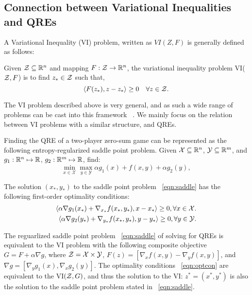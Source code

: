 \subsection{Connection between Variational Inequalities and QREs}
A Variational Inequality (VI) problem, written as $VI(Z, F)$ is generally defined as follows:
\begin{definition}
	\label{def:vi} Given $\mathcal{Z} \subseteq \mathbb{R}^n$ and mapping $F: \mathcal{Z} \rightarrow
		\mathbb{R}^n$, the variational inequality problem VI($\mathcal{Z}, F$) is to find $z_{\ast} \in \mathcal{Z}$ such that,
	\[ \langle F(z_{\ast}), z - z_{\ast} \rangle \geq 0 \quad \forall z \in \mathcal{Z}.
	\]
\end{definition}

The VI problem described above is very general, and as such a wide range of problems can be cast
into this framework~ \cite{facchineiFiniteDimensional2004}.
We mainly focus on the relation between VI problems with a similar structure, and QREs.

Finding the QRE of a two-player zero-sum game can be represented as the following
entropy-regularized saddle point problem.
Given $\mathcal{X} \subseteq \mathbb{R}^n$, $\mathcal{Y} \subseteq \mathbb{R}^m$, and $g_1: \mathbb{R}^n \mapsto \mathbb{R}$, $g_2: \mathbb{R}^m \mapsto
	\mathbb{R}$, find:
\begin{equation}
	\label{eqn:saddle} \min_{x \in \mathcal{X}} \max_{y \in \mathcal{Y}}
	\alpha g_1(x) + f(x, y) + \alpha g_2(y),
\end{equation}

The solution
$(x_{\ast}, y_{\ast})$ to the saddle point problem~ \ref{eqn:saddle} has the following first-order
optimality conditions:
\begin{equation}
	\label{eqn:optcon}
	\begin{split}
		\langle \alpha \nabla
		g_1(x_*) + \nabla_{x_*} f(x_*, y_*), x - x_* \rangle \geq 0, \forall x \in \mathcal{X}.
		\\
		\langle \alpha \nabla g_2(y_*) +
		\nabla_{y_*} f(x_*, y_*),
		y - y_* \rangle \geq 0, \forall y \in \mathcal{Y}.
	\end{split}
\end{equation}

The reguarlized saddle point problem~ \ref{eqn:saddle} of solving for QREs is equivalent to the VI
problem with the following composite objective $G = F + \alpha \nabla g$, where $\mathcal{Z} =
	\mathcal{X} \times \mathcal{Y}$, $F(z) = [\nabla_x f(x,y) - \nabla_y f(x,y)]$, and $\nabla g =
	[\nabla_y g_1(x), \nabla_x g_2(y)]$.
The optimality conditions~ \ref{eqn:optcon} are equivalent to the VI$(\mathcal{Z}, G)$, and thus the
solution to the VI: $z^* = (x^*, y^*)$ is also the solution to the saddle point problem stated in~
\ref{eqn:saddle}.

